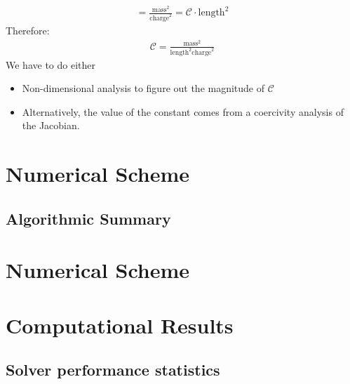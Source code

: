 \documentclass[preprint,1p]{elsarticle}
\begin{document}
\begin{align*}
[d_e^2] = \frac{\text{mass}^2}{\text{charge}^2} = \mathcal{C}
\cdot \text{length}^2
\end{align*}
Therefore:
\begin{align*}
\mathcal{C} = \frac{\text{mass}^2}{\text{length}^2 \text{charge}^2}
\end{align*}
We have to do either
\begin{itemize}
\item[--] Non-dimensional analysis to figure out the magnitude of  $\mathcal{C}$
\item[--] Alternatively, the value of the constant comes from a coercivity
analysis of the Jacobian.
\end{itemize}



\newpage
\section{Numerical Scheme}




\newpage
\subsection{Algorithmic Summary}




\newpage
\section{Numerical Scheme}





\newpage
\section{Computational Results}


\subsection{Solver performance statistics}
\end{document}
